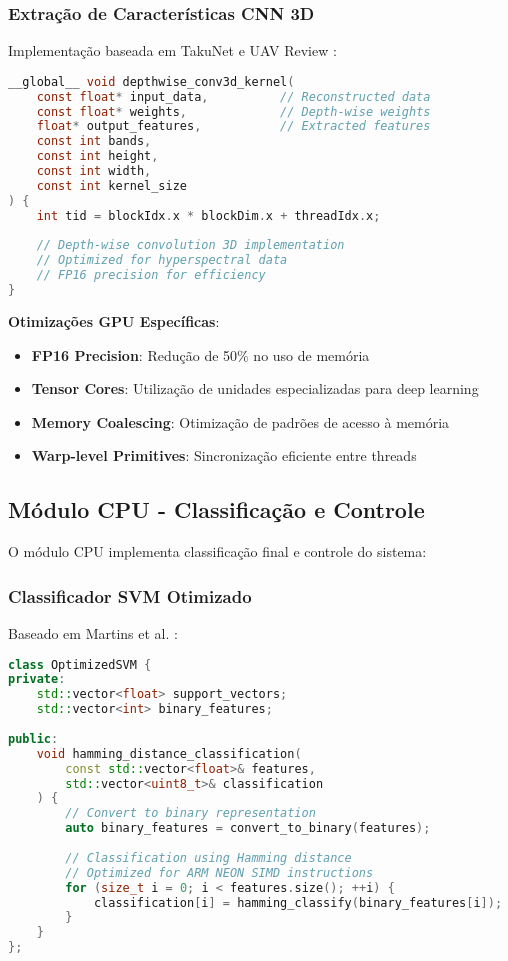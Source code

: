 \subsubsection{Extração de Características CNN 3D}

Implementação baseada em TakuNet \cite{takunet2025} e UAV Review \cite{uav_review_2024}:

\begin{lstlisting}[language=c, caption=CNN 3D Otimizada]
__global__ void depthwise_conv3d_kernel(
    const float* input_data,          // Reconstructed data
    const float* weights,             // Depth-wise weights
    float* output_features,           // Extracted features
    const int bands, 
    const int height, 
    const int width,
    const int kernel_size
) {
    int tid = blockIdx.x * blockDim.x + threadIdx.x;
    
    // Depth-wise convolution 3D implementation
    // Optimized for hyperspectral data
    // FP16 precision for efficiency
}
\end{lstlisting}

\textbf{Otimizações GPU Específicas}:
\begin{itemize}
\item \textbf{FP16 Precision}: Redução de 50\% no uso de memória
\item \textbf{Tensor Cores}: Utilização de unidades especializadas para deep learning
\item \textbf{Memory Coalescing}: Otimização de padrões de acesso à memória
\item \textbf{Warp-level Primitives}: Sincronização eficiente entre threads
\end{itemize}

\subsection{Módulo CPU - Classificação e Controle}

O módulo CPU implementa classificação final e controle do sistema:

\subsubsection{Classificador SVM Otimizado}

Baseado em Martins et al. \cite{martins2019}:

\begin{lstlisting}[language=c++, caption=SVM com Distância de Hamming]
class OptimizedSVM {
private:
    std::vector<float> support_vectors;
    std::vector<int> binary_features;
    
public:
    void hamming_distance_classification(
        const std::vector<float>& features,
        std::vector<uint8_t>& classification
    ) {
        // Convert to binary representation
        auto binary_features = convert_to_binary(features);
        
        // Classification using Hamming distance
        // Optimized for ARM NEON SIMD instructions
        for (size_t i = 0; i < features.size(); ++i) {
            classification[i] = hamming_classify(binary_features[i]);
        }
    }
};
\end{lstlisting}

